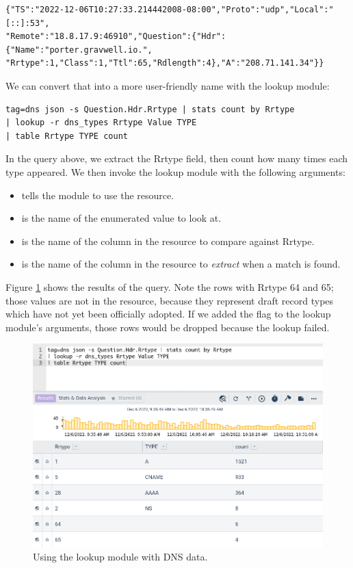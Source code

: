 \begin{verbatim}
{"TS":"2022-12-06T10:27:33.214442008-08:00","Proto":"udp","Local":"[::]:53",
"Remote":"18.8.17.9:46910","Question":{"Hdr":{"Name":"porter.gravwell.io.",
"Rrtype":1,"Class":1,"Ttl":65,"Rdlength":4},"A":"208.71.141.34"}}
\end{verbatim}

We can convert that into a more user-friendly name with the lookup module:

\begin{verbatim}
tag=dns json -s Question.Hdr.Rrtype | stats count by Rrtype 
| lookup -r dns_types Rrtype Value TYPE 
| table Rrtype TYPE count
\end{verbatim}

In the query above, we extract the Rrtype field, then count how many times each type appeared. We then invoke the lookup module with the following arguments:

\begin{itemize}
\item {} tells the module to use the  resource.
\item {} is the name of the enumerated value to look at.
\item {} is the name of the column in the resource to compare against Rrtype.
\item {} is the name of the column in the resource to \emph{extract} when a match is found.
\end{itemize}

Figure \ref{fig:lookup1} shows the results of the query. Note the rows with Rrtype 64 and 65; those values are not in the resource, because they represent draft record types which have not yet been officially adopted. If we added the  flag to the lookup module's arguments, those rows would be dropped because the lookup failed.

\begin{figure}
	\includegraphics[width=0.8\linewidth]{images/lookup1.png}
	\caption{Using the lookup module with DNS data.}
	\label{fig:lookup1}
\end{figure}


